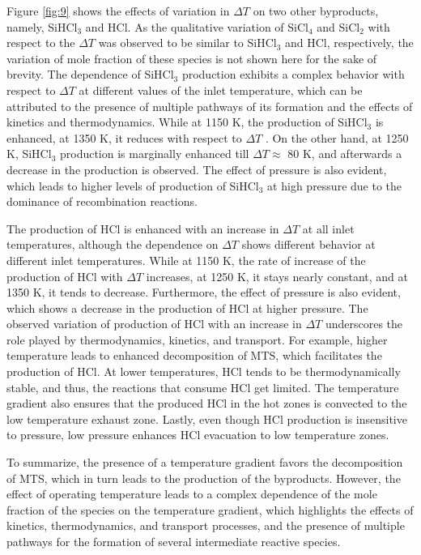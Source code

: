 \documentclass[final, letterpaper, square, comma, numbers, sort&compress]{elsarticle}
\begin{document}
Figure \ref{fig:9} shows the effects of variation in $\Delta T$ on two other byproducts, namely, SiHCl$_3$ and HCl. As the qualitative variation of SiCl$_4$ and SiCl$_2$ with respect to the $\Delta T$ was observed to be similar to SiHCl$_3$ and HCl, respectively, the variation of mole fraction of these species is not shown here for the sake of brevity. The dependence of SiHCl$_3$ production exhibits a complex behavior with respect to $\Delta T$ at different values of the inlet temperature, which can be attributed to the presence of multiple pathways of its formation and the effects of kinetics and thermodynamics. While at 1150 K, the production of SiHCl$_3$ is enhanced, at 1350 K, it reduces with respect to $\Delta T$ . On the other hand, at 1250 K, SiHCl$_3$ production is marginally enhanced till $\Delta T \approx$ 80 K, and afterwards a decrease in the production is observed. The effect of pressure is also evident, which leads to higher levels of production of SiHCl$_3$ at high pressure due to the dominance of recombination reactions.

The production of HCl is enhanced with an increase in $\Delta T$ at all inlet temperatures, although the dependence on $\Delta T$ shows different behavior at different inlet temperatures. While at 1150 K, the rate of increase of the production of HCl with $\Delta T$ increases, at 1250 K, it stays nearly constant, and at 1350 K, it tends to decrease. Furthermore, the effect of pressure is also evident, which shows a decrease in the production of HCl at higher pressure. The observed variation of production of HCl with an increase in $\Delta T$ underscores the role played by thermodynamics, kinetics, and transport. For example, higher temperature leads to enhanced decomposition of MTS, which facilitates the production of HCl. At lower temperatures, HCl tends to be thermodynamically stable, and thus, the reactions that consume HCl get limited. The temperature gradient also ensures that the produced HCl in the hot zones is convected to the low temperature exhaust zone. Lastly, even though HCl production is insensitive to pressure, low pressure enhances HCl evacuation to low temperature zones.

To summarize, the presence of a temperature gradient favors the decomposition of MTS, which in turn leads to the production of the byproducts. However, the effect of operating temperature leads to a complex dependence of the mole fraction of the species on the temperature gradient, which highlights the effects of kinetics, thermodynamics, and transport processes, and the presence of multiple pathways for the formation of several intermediate reactive species.
\end{document}
